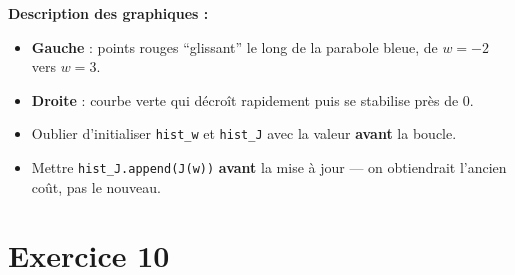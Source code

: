 \textbf{Description des graphiques :}
\begin{itemize}
    \item \textbf{Gauche} : points rouges ``glissant'' le long de la parabole bleue, de $w = -2$ vers $w = 3$.
    \item \textbf{Droite} : courbe verte qui d\'{e}cro\^{i}t rapidement puis se stabilise pr\`{e}s de 0.
\end{itemize}

\begin{attentionbox}
    \begin{itemize}
        \item Oublier d'initialiser \texttt{hist\_w} et \texttt{hist\_J} avec la valeur \textbf{avant} la boucle.
        \item Mettre \texttt{hist\_J.append(J(w))} \textbf{avant} la mise \`{a} jour --- on obtiendrait l'ancien co\^{u}t, pas le nouveau.
    \end{itemize}
\end{attentionbox}

\section*{Exercice 10 \hfill \exointermediaire}

\separateur

